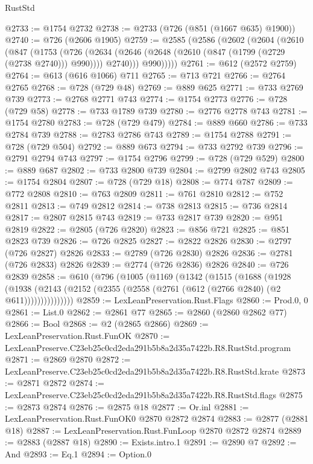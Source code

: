 \begin{lexlean}{RustStd}
\begin{coremodule}
@2733 := @1754 @2732
@2738 := @2733 (@726 (@851 (@1667 @635) @1900))
@2740 := @726 (@2606 @1905)
@2759 := @2585
    (@2586
      (@2602
        (@2604
          (@2610
            (@847
              (@1753
                (@726
                  (@2634 (@2646 (@2648 (@2610 (@847 (@1799 (@2729 (@2738 @2740))) @990)))) @2740)))
              @990)))))
@2761 := @612 (@2572 @2759)
@2764 := @613 (@616 @1066) @711
@2765 := @713 @721
@2766 := @2764 @2765
@2768 := @728 (@729 @48)
@2769 := @889 @625
@2771 := @733 @2769 @739
@2773 := @2768 @2771 @743
@2774 := @1754 @2773
@2776 := @728 (@729 @58)
@2778 := @733 @1789 @739
@2780 := @2776 @2778 @743
@2781 := @1754 @2780
@2783 := @728 (@729 @479)
@2784 := @889 @660
@2786 := @733 @2784 @739
@2788 := @2783 @2786 @743
@2789 := @1754 @2788
@2791 := @728 (@729 @504)
@2792 := @889 @673
@2794 := @733 @2792 @739
@2796 := @2791 @2794 @743
@2797 := @1754 @2796
@2799 := @728 (@729 @529)
@2800 := @889 @687
@2802 := @733 @2800 @739
@2804 := @2799 @2802 @743
@2805 := @1754 @2804
@2807 := @728 (@729 @18)
@2808 := @774 @787
@2809 := @772 @2808
@2810 := @763 @2809
@2811 := @761 @2810
@2812 := @752 @2811
@2813 := @749 @2812
@2814 := @738 @2813
@2815 := @736 @2814
@2817 := @2807 @2815 @743
@2819 := @733 @2817 @739
@2820 := @951 @2819
@2822 := @2805 (@726 @2820)
@2823 := @856 @721
@2825 := @851 @2823 @739
@2826 := @726 @2825
@2827 := @2822 @2826
@2830 := @2797 (@726 @2827) @2826
@2833 := @2789 (@726 @2830) @2826
@2836 := @2781 (@726 @2833) @2826
@2839 := @2774 (@726 @2836) @2826
@2840 := @726 @2839
@2858 := @610
    (@796
      (@1005
        (@1169
          (@1342
            (@1515
              (@1688
                (@1928
                  (@1938
                    (@2143 (@2152 (@2355 (@2558 (@2761 (@612 (@2766 @2840) (@2 @611)))))))))))))))
@2859 := LexLeanPreservation.Rust.Flags
@2860 := Prod.{0, 0}
@2861 := List.{0}
@2862 := @2861 @77
@2865 := @2860 (@2860 @2862 @77)
@2866 := Bool
@2868 := @2 (@2865 @2866)
@2869 := LexLeanPreservation.Rust.FunOK
@2870 := LexLeanPreserve.C23eb25c0cd2eda291b5b8a2d35a7422b.R8.RustStd.program
@2871 := @2869 @2870
@2872 := LexLeanPreserve.C23eb25c0cd2eda291b5b8a2d35a7422b.R8.RustStd.krate
@2873 := @2871 @2872
@2874 := LexLeanPreserve.C23eb25c0cd2eda291b5b8a2d35a7422b.R8.RustStd.flags
@2875 := @2873 @2874
@2876 := @2875 @18
@2877 := Or.inl
@2881 := LexLeanPreservation.Rust.FunOK0 @2870 @2872 @2874
@2883 := @2877 (@2881 @18)
@2887 := LexLeanPreservation.Rust.FunLoop @2870 @2872 @2874
@2889 := @2883 (@2887 @18)
@2890 := Exists.intro.{1}
@2891 := @2890 @7
@2892 := And
@2893 := Eq.{1}
@2894 := Option.{0}

\end{coremodule}
\end{lexlean}
